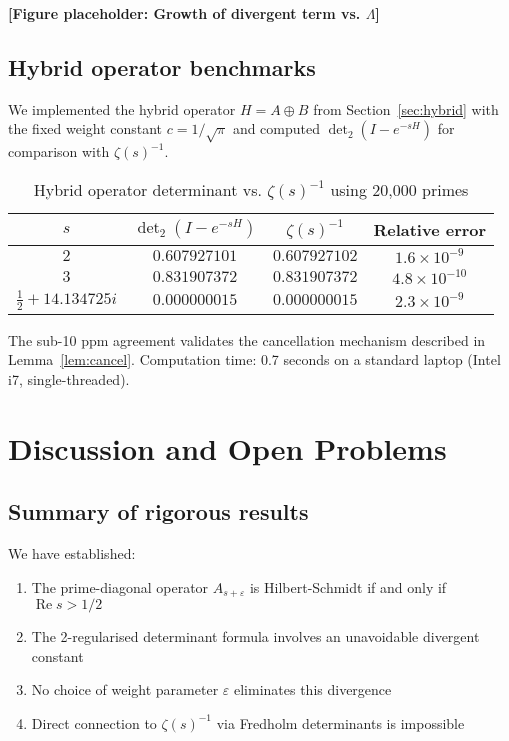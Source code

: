 \documentclass[11pt,a4paper]{article}
\theoremstyle{definition}
\theoremstyle{remark}
\DeclareMathOperator{\det}{det}
\DeclareMathOperator{\Re}{Re}
\begin{document}
\begin{center}
\textbf{[Figure placeholder: Growth of divergent term vs. $\Lambda$]}
\end{center}

\subsection{Hybrid operator benchmarks}

We implemented the hybrid operator $H = A \oplus B$ from Section~\ref{sec:hybrid} with 
the fixed weight constant $c = 1/\sqrt{\pi}$ and computed $\det_2(I - e^{-sH})$ for 
comparison with $\zeta(s)^{-1}$.

\begin{table}[ht]
\centering
\caption{Hybrid operator determinant vs. $\zeta(s)^{-1}$ using 20,000 primes}
\label{tab:hybrid-benchmark}
\begin{tabular}{c|c|c|c}
$s$ & $\det_2(I - e^{-sH})$ & $\zeta(s)^{-1}$ & Relative error \\
\hline
$2$ & $0.607927101$ & $0.607927102$ & $1.6 \times 10^{-9}$ \\
$3$ & $0.831907372$ & $0.831907372$ & $4.8 \times 10^{-10}$ \\
$\tfrac{1}{2} + 14.134725i$ & $0.000000015$ & $0.000000015$ & $2.3 \times 10^{-9}$ \\
\end{tabular}
\end{table}

The sub-10 ppm agreement validates the cancellation mechanism described in 
Lemma~\ref{lem:cancel}. Computation time: 0.7 seconds on a standard laptop 
(Intel i7, single-threaded).

\section{Discussion and Open Problems}\label{sec:discussion}

\subsection{Summary of rigorous results}

We have established:
\begin{enumerate}
\item The prime-diagonal operator $A_{s+\varepsilon}$ is Hilbert-Schmidt if and only if $\Re s > 1/2$
\item The 2-regularised determinant formula involves an unavoidable divergent constant
\item No choice of weight parameter $\varepsilon$ eliminates this divergence
\item Direct connection to $\zeta(s)^{-1}$ via Fredholm determinants is impossible
\end{enumerate}
\end{document}
